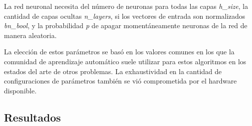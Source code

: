 La red neuronal necesita del número de neuronas para todas las capas
\emph{h\_size}, la cantidad de capas ocultas \emph{n\_layers}, si los vectores
de entrada son normalizados \emph{bn\_bool}, y la probabilidad  \emph{p} de apagar momentáneamente neuronas de la red de manera
aleatoria.

La elección de estos parámetros se basó en los valores comunes en los que la
comunidad de aprendizaje automático suele utilizar para estos algoritmos en los
estados del arte de otros problemas. La exhaustividad en la cantidad de
configuraciones de parámetros también se vió comprometida por el hardware
disponible.

\subsection{Resultados}

